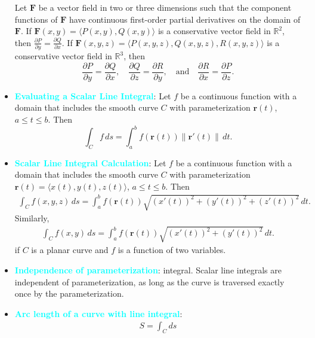 \documentclass{report}
\begin{document}
\begin{itemize}
            Let $\mathbf{F}$ be a vector field in two or three dimensions such that the component functions of $\mathbf{F}$ have continuous first-order partial derivatives on the domain of $\mathbf{F}$.
            \bigbreak \noindent 
            If $\mathbf{F}(x,y) = \langle P(x,y), Q(x,y) \rangle$ is a conservative vector field in $\mathbb{R}^2$, then $\frac{\partial P}{\partial y} = \frac{\partial Q}{\partial x}$.
            \bigbreak \noindent 
            If $\mathbf{F}(x,y,z) = \langle P(x,y,z), Q(x,y,z), R(x,y,z) \rangle$ is a conservative vector field in $\mathbb{R}^3$, then
            \[
                \frac{\partial P}{\partial y} = \frac{\partial Q}{\partial x}, \quad \frac{\partial Q}{\partial z} = \frac{\partial R}{\partial y}, \quad \text{and} \quad \frac{\partial R}{\partial x} = \frac{\partial P}{\partial z}.
            \]
        \item \textbf{\textcolor{cyan}{Evaluating a Scalar Line Integral}}:
            Let \(f\) be a continuous function with a domain that includes the smooth curve \(C\) with parameterization \(\mathbf{r}(t)\), \(a \leq t \leq b\). Then
            \[
                \int_C f\,ds = \int_a^b f(\mathbf{r}(t)) \|\mathbf{r}'(t)\|\,dt.
            \]
        \item \textbf{\textcolor{cyan}{Scalar Line Integral Calculation}}:
            Let $f$ be a continuous function with a domain that includes the smooth curve $C$ with parameterization $\mathbf{r}(t) = \langle x(t), y(t), z(t) \rangle$, $a \leq t \leq b$. Then
            \begin{align*}
                \int_{C} f(x,y,z)\,ds = \int_{a}^{b} f(\mathbf{r}(t))\sqrt{(x'(t))^2 + (y'(t))^2 + (z'(t))^2}\,dt 
            .\end{align*}
            Similarly,
            \begin{align*}
                \int_{C} f(x,y)\,ds = \int_{a}^{b} f(\mathbf{r}(t))\sqrt{(x'(t))^2 + (y'(t))^2}\,dt
            .\end{align*}
            if $C$ is a planar curve and $f$ is a function of two variables.
        \item \textbf{\textcolor{cyan}{Independence of parameterization}}:
            integral. Scalar line integrals are independent of parameterization, as long as the curve is traversed exactly once by the parameterization.
        \item \textbf{\textcolor{cyan}{Arc length of a curve with line integral}}:
            \begin{align*}
                S = \int_C ds

\end{align*}
\end{itemize}
\end{document}
